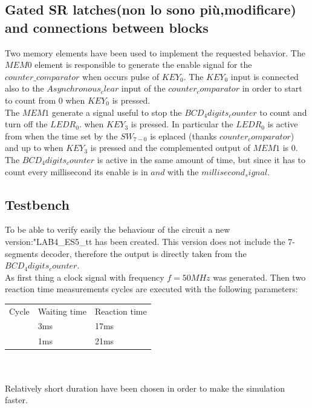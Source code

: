 \documentclass[12pt]{article}
\begin{document}
\subsection{Gated SR latches(non lo sono più,modificare) and connections between blocks}
Two memory elements have been used to implement the requested behavior. 
The $MEM0$ element is responsible to generate the enable signal for the $counter\_comparator$ when occurs pulse of $KEY_0$. The $KEY_0$ input is connected also to the $Asynchronous_clear$ input of the $counter_comparator$ in order to start to count from $0$ when $KEY_0$ is pressed.
\\The $MEM1$ generate a signal useful to stop the $BCD_4digits_counter$ to count and turn off the $LEDR_0$. when $KEY_3$ is pressed. In particular the $LEDR_0$ is active from when the time set by the $SW_{7-0}$ is eplaced (thanks $counter_comparator$) and up to when $KEY_3$ is pressed and the complemented output of $MEM1$ is $0$. The $BCD_4digits_counter$ is active in the same amount of time, but since it has to count every millisecond its enable is in $and$ with the $millisecond_signal$.
\subsection{Testbench}
To be able to verify easily the behaviour of the circuit a new version:"LAB4\_ES5\_tt has been created. This version does not include the 7-segments decoder, therefore the output is directly taken from the $BCD_4digits_counter$. \\
As first thing a clock signal with frequency $f=50MHz$ was generated. 
Then two reaction time measurements cycles are executed with the following parameters:

	\begin{tabular}{lll}
		Cycle & Waiting time & Reaction time \\
		& 3ms          & 17ms          \\
		& 1ms          & 21ms         
	\end{tabular}
\\
\\
Relatively short duration have been chosen in order to make the simulation faster.
\end{document}
